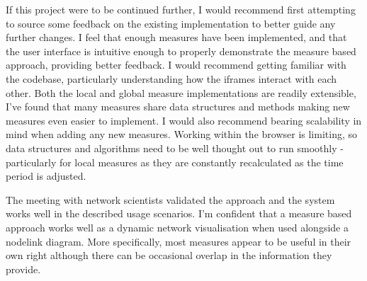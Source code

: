 If this project were to be continued further, I would recommend first attempting to source some feedback on the existing implementation to better guide any further changes. I feel that enough measures have been implemented, and that the user interface is intuitive enough to properly demonstrate the measure based approach, providing better feedback. I would recommend getting familiar with the codebase, particularly understanding how the iframes interact with each other. Both the local and global measure implementations are readily extensible, I've found that many measures share data structures and methods making new measures even easier to implement.
I would also recommend bearing scalability in mind when adding any new measures. Working within the browser is limiting, so data structures and algorithms need to be well thought out to run smoothly - particularly for local measures as they are constantly recalculated as the time period is adjusted.

The meeting with network scientists validated the approach and the system works well in the described usage scenarios. I'm confident that a measure based approach works well as a dynamic network visualisation when used alongside a nodelink diagram. More specifically, most measures appear to be useful in their own right although there can be occasional overlap in the information they provide. 
